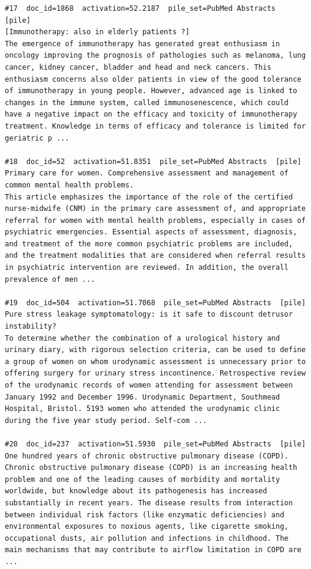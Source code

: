 \begin{verbatim}
#17  doc_id=1868  activation=52.2187  pile_set=PubMed Abstracts  [pile]
[Immunotherapy: also in elderly patients ?]
The emergence of immunotherapy has generated great enthusiasm in oncology improving the prognosis of pathologies such as melanoma, lung cancer, kidney cancer, bladder and head and neck cancers. This enthusiasm concerns also older patients in view of the good tolerance of immunotherapy in young people. However, advanced age is linked to changes in the immune system, called immunosenescence, which could have a negative impact on the efficacy and toxicity of immunotherapy treatment. Knowledge in terms of efficacy and tolerance is limited for geriatric p ...

#18  doc_id=52  activation=51.8351  pile_set=PubMed Abstracts  [pile]
Primary care for women. Comprehensive assessment and management of common mental health problems.
This article emphasizes the importance of the role of the certified nurse-midwife (CNM) in the primary care assessment of, and appropriate referral for women with mental health problems, especially in cases of psychiatric emergencies. Essential aspects of assessment, diagnosis, and treatment of the more common psychiatric problems are included, and the treatment modalities that are considered when referral results in psychiatric intervention are reviewed. In addition, the overall prevalence of men ...

#19  doc_id=504  activation=51.7068  pile_set=PubMed Abstracts  [pile]
Pure stress leakage symptomatology: is it safe to discount detrusor instability?
To determine whether the combination of a urological history and urinary diary, with rigorous selection criteria, can be used to define a group of women on whom urodynamic assessment is unnecessary prior to offering surgery for urinary stress incontinence. Retrospective review of the urodynamic records of women attending for assessment between January 1992 and December 1996. Urodynamic Department, Southmead Hospital, Bristol. 5193 women who attended the urodynamic clinic during the five year study period. Self-com ...

#20  doc_id=237  activation=51.5930  pile_set=PubMed Abstracts  [pile]
One hundred years of chronic obstructive pulmonary disease (COPD).
Chronic obstructive pulmonary disease (COPD) is an increasing health problem and one of the leading causes of morbidity and mortality worldwide, but knowledge about its pathogenesis has increased substantially in recent years. The disease results from interaction between individual risk factors (like enzymatic deficiencies) and environmental exposures to noxious agents, like cigarette smoking, occupational dusts, air pollution and infections in childhood. The main mechanisms that may contribute to airflow limitation in COPD are ...

\end{verbatim}

